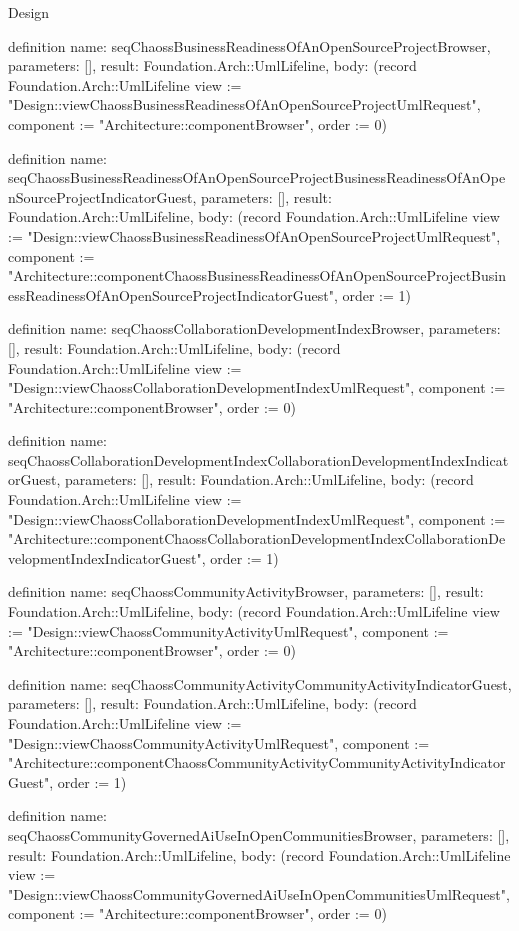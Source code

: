 \begin{lexlean}{Design}
\begin{semanticmodule}
definition{
  name: seqChaossBusinessReadinessOfAnOpenSourceProjectBrowser,
  parameters: [],
  result: Foundation.Arch::UmlLifeline,
  body: (record Foundation.Arch::UmlLifeline {view := "Design::viewChaossBusinessReadinessOfAnOpenSourceProjectUmlRequest", component := "Architecture::componentBrowser", order := 0})
}

definition{
  name: seqChaossBusinessReadinessOfAnOpenSourceProjectBusinessReadinessOfAnOpenSourceProjectIndicatorGuest,
  parameters: [],
  result: Foundation.Arch::UmlLifeline,
  body: (record Foundation.Arch::UmlLifeline {view := "Design::viewChaossBusinessReadinessOfAnOpenSourceProjectUmlRequest", component := "Architecture::componentChaossBusinessReadinessOfAnOpenSourceProjectBusinessReadinessOfAnOpenSourceProjectIndicatorGuest", order := 1})
}

definition{
  name: seqChaossCollaborationDevelopmentIndexBrowser,
  parameters: [],
  result: Foundation.Arch::UmlLifeline,
  body: (record Foundation.Arch::UmlLifeline {view := "Design::viewChaossCollaborationDevelopmentIndexUmlRequest", component := "Architecture::componentBrowser", order := 0})
}

definition{
  name: seqChaossCollaborationDevelopmentIndexCollaborationDevelopmentIndexIndicatorGuest,
  parameters: [],
  result: Foundation.Arch::UmlLifeline,
  body: (record Foundation.Arch::UmlLifeline {view := "Design::viewChaossCollaborationDevelopmentIndexUmlRequest", component := "Architecture::componentChaossCollaborationDevelopmentIndexCollaborationDevelopmentIndexIndicatorGuest", order := 1})
}

definition{
  name: seqChaossCommunityActivityBrowser,
  parameters: [],
  result: Foundation.Arch::UmlLifeline,
  body: (record Foundation.Arch::UmlLifeline {view := "Design::viewChaossCommunityActivityUmlRequest", component := "Architecture::componentBrowser", order := 0})
}

definition{
  name: seqChaossCommunityActivityCommunityActivityIndicatorGuest,
  parameters: [],
  result: Foundation.Arch::UmlLifeline,
  body: (record Foundation.Arch::UmlLifeline {view := "Design::viewChaossCommunityActivityUmlRequest", component := "Architecture::componentChaossCommunityActivityCommunityActivityIndicatorGuest", order := 1})
}

definition{
  name: seqChaossCommunityGovernedAiUseInOpenCommunitiesBrowser,
  parameters: [],
  result: Foundation.Arch::UmlLifeline,
  body: (record Foundation.Arch::UmlLifeline {view := "Design::viewChaossCommunityGovernedAiUseInOpenCommunitiesUmlRequest", component := "Architecture::componentBrowser", order := 0})
}


\end{semanticmodule}
\end{lexlean}
